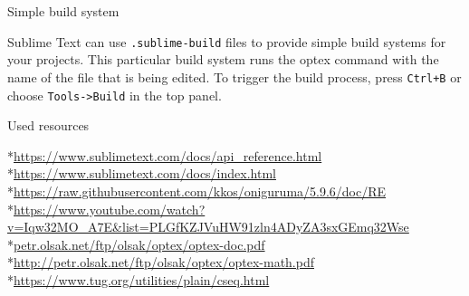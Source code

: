 \nonum\secc Simple build system

Sublime Text can use {\tt .sublime-build} files to provide simple build systems for your projects. This particular build system runs 
the optex command with the name of the file that is being edited. To trigger the build process, press {\tt Ctrl+B} or choose {\tt Tools->Build} in
the top panel.

\nonum\sec Used resources

\begitems
*\url{https://www.sublimetext.com/docs/api_reference.html}
*\url{https://www.sublimetext.com/docs/index.html}
*\url{https://raw.githubusercontent.com/kkos/oniguruma/5.9.6/doc/RE}
*\url{https://www.youtube.com/watch?v=Iqw32MO_A7E\&list=PLGfKZJVuHW91zln4ADyZA3sxGEmq32Wse}
*\url{petr.olsak.net/ftp/olsak/optex/optex-doc.pdf}
*\url{http://petr.olsak.net/ftp/olsak/optex/optex-math.pdf}
*\url{https://www.tug.org/utilities/plain/cseq.html}
\enditems

\bye